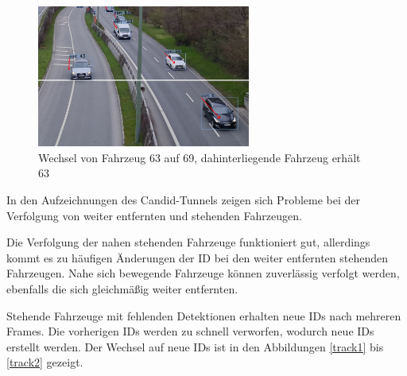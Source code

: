 \documentclass[conference]{IEEEtran}
\begin{document}
	\begin{figure}[!h]
		\begin{center}
			\includegraphics[width=7cm]{Media/switch4.jpg}
			\caption{Wechsel von Fahrzeug 63 auf 69, dahinterliegende Fahrzeug erhält 63}
			\label{track6}
		\end{center}
	\end{figure}
	
	
	In den Aufzeichnungen des Candid-Tunnels zeigen sich Probleme bei der Verfolgung von weiter entfernten und stehenden Fahrzeugen.
	
	Die Verfolgung der nahen stehenden Fahrzeuge funktioniert gut, allerdings kommt es zu
	häufigen Änderungen der ID bei den weiter entfernten stehenden Fahrzeugen.
	Nahe sich bewegende Fahrzeuge können zuverlässig verfolgt werden, ebenfalls die sich gleichmäßig weiter entfernten.
	
	Stehende Fahrzeuge mit fehlenden Detektionen erhalten neue IDs nach mehreren
	Frames. Die vorherigen IDs werden zu schnell verworfen, wodurch neue IDs erstellt werden.
	Der Wechsel auf neue IDs ist in den Abbildungen \ref{track1} bis \ref{track2} 
	gezeigt.
	
\end{document}
